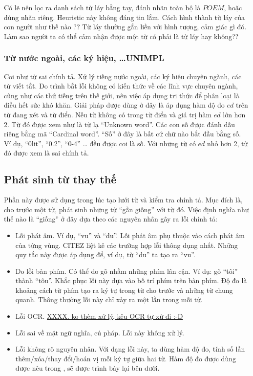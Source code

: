 \documentclass[a4paper,oneside]{book} %
\newcommand{\note}[1]{\underline{#1}}
\begin{document}
Có lẽ nên lọc ra danh sách từ láy bằng tay, đánh nhãn toàn bộ là
$POEM$, hoặc dùng nhãn riêng. Heuristic này không đáng tin lắm.
Cách hình thành từ láy của con người như thế nào ?? Từ láy thường gắn
liền với hình tượng, cảm giác gì đó. Làm sao người ta có thể cảm nhận
được một từ có phải là từ láy hay không??

\subsubsection{Từ nước ngoài, các ký hiệu, \ldots UNIMPL}

Coi như từ sai chính tả.
Xử lý tiếng nước ngoài, các ký hiệu chuyên ngành, các từ viết tắt. Do
trình bắt lỗi không có kiến thức về các lĩnh vực chuyên 
ngành, cũng như các thứ tiếng trên thế giới, nên việc áp dụng tri thức
để phân loại là điều hết sức khó khăn. Giải pháp được dùng ở đây là áp
dụng hàm độ đo $ed$ trên từ đang xét và từ điển. Nếu từ không có trong
từ điển và giá trị hàm $ed$ lớn hơn 2. Từ đó được xem như là từ lạ
``Unknown word''. Các con số được đánh dấu riêng bằng mã ``Cardinal word''.
``Số'' ở đây là bất cứ chữ nào bắt đầu bằng số. Ví dụ, ``0lit'',
``0.2'', ``0-4'' \ldots{} đều được coi là số. Với những từ có $ed$ nhỏ
hơn 2, từ đó được xem là sai chính tả. 

\subsection{Phát sinh từ thay thế}

Phần này được sử dụng trong lúc tạo lưới từ và kiểm tra chính
tả. Mục đích là, cho trước một từ, phát sinh những từ ``gần giống''
với từ đó. Việc định nghĩa như thế nào là ``giống'' ở đây dựa theo các
nguyên nhân gây ra lỗi chính tả:
\begin{itemize}
\item Lỗi phát âm. Ví dụ, ``vu'' và ``du''. Lỗi phát âm phụ thuộc vào
  cách phát âm của từng vùng. CITEZ liệt kê các trường hợp lỗi thông
  dụng nhất. Những quy tắc này được áp dụng để, ví dụ, từ ``du'' ta
  tạo ra ``vu''.
\item Do lỗi bàn phím. Có thể do gõ nhầm những phím lân cận. Ví dụ: gõ
  ``tôi'' thành ``tôu''. Khắc phục lỗi này dựa vào bố trí phím trên
  bàn phím. Độ đo là khoảng cách từ phím tạo ra ký tự trong từ cho
  trước và những từ chung quanh. Thông thường lỗi này chỉ xảy ra một
  lần trong mỗi từ.
\item Lỗi OCR. \note{XXXX. ko thèm xử lý, kêu OCR tự xử đi :-D}
\item Lỗi sai về mặt ngữ nghĩa, cú pháp. Lỗi này không xử lý.
\item Lỗi không rõ nguyên nhân. Với dạng lỗi này, ta dùng hàm độ đo,
  tính số lần thêm/xóa/thay đổi/hoán vị mỗi ký tự giữa hai từ. Hàm độ đo
  được dùng được nêu trong \cite{Oflazer}, sẽ được trình bày lại bên
  dưới.
\end{itemize}
\end{document}
